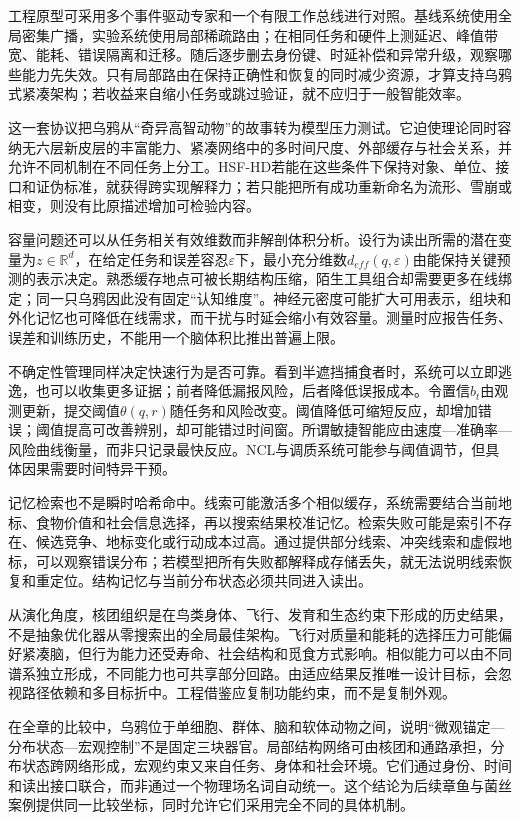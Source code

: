 工程原型可采用多个事件驱动专家和一个有限工作总线进行对照。基线系统使用全局密集广播，实验系统使用局部稀疏路由；在相同任务和硬件上测延迟、峰值带宽、能耗、错误隔离和迁移。随后逐步删去身份键、时延补偿和异常升级，观察哪些能力先失效。只有局部路由在保持正确性和恢复的同时减少资源，才算支持乌鸦式紧凑架构；若收益来自缩小任务或跳过验证，就不应归于一般智能效率。

这一套协议把乌鸦从“奇异高智动物”的故事转为模型压力测试。它迫使理论同时容纳无六层新皮层的丰富能力、紧凑网络中的多时间尺度、外部缓存与社会关系，并允许不同机制在不同任务上分工。HSF-HD若能在这些条件下保持对象、单位、接口和证伪标准，就获得跨实现解释力；若只能把所有成功重新命名为流形、雪崩或相变，则没有比原描述增加可检验内容。

容量问题还可以从任务相关有效维数而非解剖体积分析。设行为读出所需的潜在变量为$z\in\mathbb R^d$，在给定任务和误差容忍$\varepsilon$下，最小充分维数$d_{eff}(q,\varepsilon)$由能保持关键预测的表示决定。熟悉缓存地点可被长期结构压缩，陌生工具组合却需要更多在线绑定；同一只乌鸦因此没有固定“认知维度”。神经元密度可能扩大可用表示，组块和外化记忆也可降低在线需求，而干扰与时延会缩小有效容量。测量时应报告任务、误差和训练历史，不能用一个脑体积比推出普遍上限。

不确定性管理同样决定快速行为是否可靠。看到半遮挡捕食者时，系统可以立即逃逸，也可以收集更多证据；前者降低漏报风险，后者降低误报成本。令置信$b_t$由观测更新，提交阈值$\theta(q,r)$随任务和风险改变。阈值降低可缩短反应，却增加错误；阈值提高可改善辨别，却可能错过时间窗。所谓敏捷智能应由速度—准确率—风险曲线衡量，而非只记录最快反应。NCL与调质系统可能参与阈值调节，但具体因果需要时间特异干预。

记忆检索也不是瞬时哈希命中。线索可能激活多个相似缓存，系统需要结合当前地标、食物价值和社会信息选择，再以搜索结果校准记忆。检索失败可能是索引不存在、候选竞争、地标变化或行动成本过高。通过提供部分线索、冲突线索和虚假地标，可以观察错误分布；若模型把所有失败都解释成存储丢失，就无法说明线索恢复和重定位。结构记忆与当前分布状态必须共同进入读出。

从演化角度，核团组织是在鸟类身体、飞行、发育和生态约束下形成的历史结果，不是抽象优化器从零搜索出的全局最佳架构。飞行对质量和能耗的选择压力可能偏好紧凑脑，但行为能力还受寿命、社会结构和觅食方式影响。相似能力可以由不同谱系独立形成，不同能力也可共享部分回路。由适应结果反推唯一设计目标，会忽视路径依赖和多目标折中。工程借鉴应复制功能约束，而不是复制外观。

在全章的比较中，乌鸦位于单细胞、群体、脑和软体动物之间，说明“微观锚定—分布状态—宏观控制”不是固定三块器官。局部结构网络可由核团和通路承担，分布状态跨网络形成，宏观约束又来自任务、身体和社会环境。它们通过身份、时间和读出接口联合，而非通过一个物理场名词自动统一。这个结论为后续章鱼与菌丝案例提供同一比较坐标，同时允许它们采用完全不同的具体机制。

